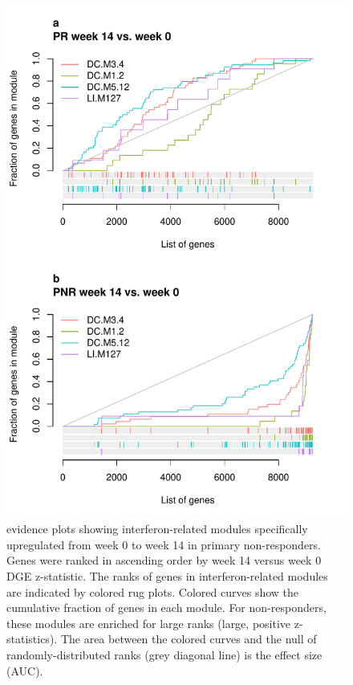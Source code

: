 \begin{figure}
    \centering
    \includegraphics[width=1.0\textwidth,page=1]{mainmatter/figures/chapter_04/plot_gene_set_enrichment.evidencePlots_C_3_1_Interferon.pdf}
    \caption{ evidence plots showing interferon-related modules specifically upregulated from week 0 to week 14 in primary non-responders. Genes were ranked in ascending order by week 14 versus week 0 \gls{DGE} z-statistic. The ranks of genes in interferon-related modules are indicated by colored rug plots. Colored curves show the cumulative fraction of genes in each module. For non-responders, these modules are enriched for large ranks (large, positive z-statistics). The area between the colored curves and the null of randomly-distributed ranks (grey diagonal line) is the effect size (AUC).}
    \label{fig:multipants_dge_evidencePlots_C_3_1_Interferon}
\end{figure}

